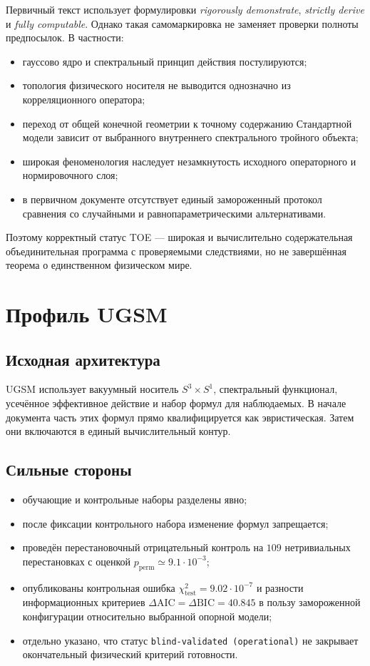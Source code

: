 \documentclass[12pt,a4paper]{article}
\begin{document}
Первичный текст использует формулировки \emph{rigorously demonstrate},
\emph{strictly derive} и \emph{fully computable}. Однако такая
самомаркировка не заменяет проверки полноты предпосылок. В частности:
\begin{itemize}
    \item гауссово ядро и спектральный принцип действия постулируются;
    \item топология физического носителя не выводится однозначно из
    корреляционного оператора;
    \item переход от общей конечной геометрии к точному содержанию
    Стандартной модели зависит от выбранного внутреннего спектрального
    тройного объекта;
    \item широкая феноменология наследует незамкнутость исходного операторного
    и нормировочного слоя;
    \item в первичном документе отсутствует единый замороженный протокол
    сравнения со случайными и равнопараметрическими альтернативами.
\end{itemize}

Поэтому корректный статус TOE --- широкая и вычислительно содержательная
объединительная программа с проверяемыми следствиями, но не завершённая
теорема о единственном физическом мире.

\section{Профиль UGSM}

\subsection{Исходная архитектура}

UGSM использует вакуумный носитель $S^3\times S^1$, спектральный функционал,
усечённое эффективное действие и набор формул для наблюдаемых. В начале
документа часть этих формул прямо квалифицируется как эвристическая. Затем
они включаются в единый вычислительный контур.

\subsection{Сильные стороны}

\begin{itemize}
    \item обучающие и контрольные наборы разделены явно;
    \item после фиксации контрольного набора изменение формул запрещается;
    \item проведён перестановочный отрицательный контроль на $109$
    нетривиальных перестановках с оценкой $p_{\mathrm{perm}}\simeq9.1\cdot10^{-3}$;
    \item опубликованы контрольная ошибка
    $\chi^2_{\mathrm{test}}=9.02\cdot10^{-7}$ и разности информационных
    критериев $\Delta\mathrm{AIC}=\Delta\mathrm{BIC}=40.845$ в пользу
    замороженной конфигурации относительно выбранной опорной модели;
    \item отдельно указано, что статус \texttt{blind-validated
    (operational)} не закрывает окончательный физический критерий готовности.
\end{itemize}
\end{document}
